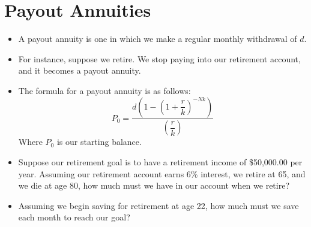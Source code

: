 \documentclass{article}
\begin{document}
\section{Payout Annuities}
\begin{itemize}
    \item A payout annuity is one in which we make a regular monthly
        withdrawal of $d$.
    \item For instance, suppose we retire.  We stop paying into our
        retirement account, and it becomes a payout annuity.
    \item The formula for a payout annuity is as follows:
    \[
            P_0 = \dfrac{d\left(1-\left(1+\dfrac{r}{k}\right)^{-Nk} \right)}%
                        {\left(\dfrac{r}{k}\right)}
    \]
    Where $P_0$ is our starting balance.

    \item Suppose our retirement goal is to have a retirement income
        of \$50,000.00 per year.  Assuming our retirement account
        earns 6\% interest, we retire at 65, and we die at age 80, how
        much must we have in our account when we retire?

    \item Assuming we begin saving for retirement at age 22, how much
        must we save each month to reach our goal?
\end{itemize}
\end{document}
